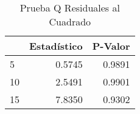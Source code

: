 \begin{table}[H]
\label{tab:q_test_resid2}
\centering
\begin{tabular}{lrr}
\toprule
 & Estad\'istico & P-Valor \\
\midrule
5 & 0.5745 & 0.9891 \\
10 & 2.5491 & 0.9901 \\
15 & 7.8350 & 0.9302 \\
\bottomrule
\end{tabular}
\caption{Prueba Q Residuales al Cuadrado}
\end{table}
